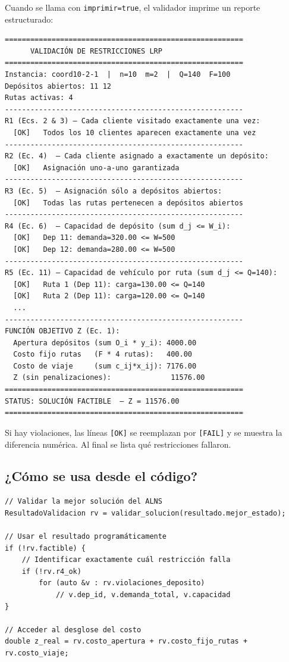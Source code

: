 \documentclass[12pt,a4paper]{article}
\begin{document}
Cuando se llama con \texttt{imprimir=true}, el validador imprime un reporte estructurado:

\begin{verbatim}
========================================================
      VALIDACIÓN DE RESTRICCIONES LRP
========================================================
Instancia: coord10-2-1  |  n=10  m=2  |  Q=140  F=100
Depósitos abiertos: 11 12
Rutas activas: 4
--------------------------------------------------------
R1 (Ecs. 2 & 3) — Cada cliente visitado exactamente una vez:
  [OK]   Todos los 10 clientes aparecen exactamente una vez
--------------------------------------------------------
R2 (Ec. 4)  — Cada cliente asignado a exactamente un depósito:
  [OK]   Asignación uno-a-uno garantizada
--------------------------------------------------------
R3 (Ec. 5)  — Asignación sólo a depósitos abiertos:
  [OK]   Todas las rutas pertenecen a depósitos abiertos
--------------------------------------------------------
R4 (Ec. 6)  — Capacidad de depósito (sum d_j <= W_i):
  [OK]   Dep 11: demanda=320.00 <= W=500
  [OK]   Dep 12: demanda=280.00 <= W=500
--------------------------------------------------------
R5 (Ec. 11) — Capacidad de vehículo por ruta (sum d_j <= Q=140):
  [OK]   Ruta 1 (Dep 11): carga=130.00 <= Q=140
  [OK]   Ruta 2 (Dep 11): carga=120.00 <= Q=140
  ...
--------------------------------------------------------
FUNCIÓN OBJETIVO Z (Ec. 1):
  Apertura depósitos (sum O_i * y_i): 4000.00
  Costo fijo rutas   (F * 4 rutas):   400.00
  Costo de viaje     (sum c_ij*x_ij): 7176.00
  Z (sin penalizaciones):              11576.00
========================================================
STATUS: SOLUCIÓN FACTIBLE  — Z = 11576.00
========================================================
\end{verbatim}

Si hay violaciones, las líneas \texttt{[OK]} se reemplazan por \texttt{[FAIL]} y se muestra la diferencia numérica. Al final se lista qué restricciones fallaron.

\subsection{¿Cómo se usa desde el código?}

\begin{verbatim}
// Validar la mejor solución del ALNS
ResultadoValidacion rv = validar_solucion(resultado.mejor_estado);

// Usar el resultado programáticamente
if (!rv.factible) {
    // Identificar exactamente cuál restricción falla
    if (!rv.r4_ok)
        for (auto &v : rv.violaciones_deposito)
            // v.dep_id, v.demanda_total, v.capacidad
}

// Acceder al desglose del costo
double z_real = rv.costo_apertura + rv.costo_fijo_rutas + rv.costo_viaje;
\end{verbatim}
\end{document}
